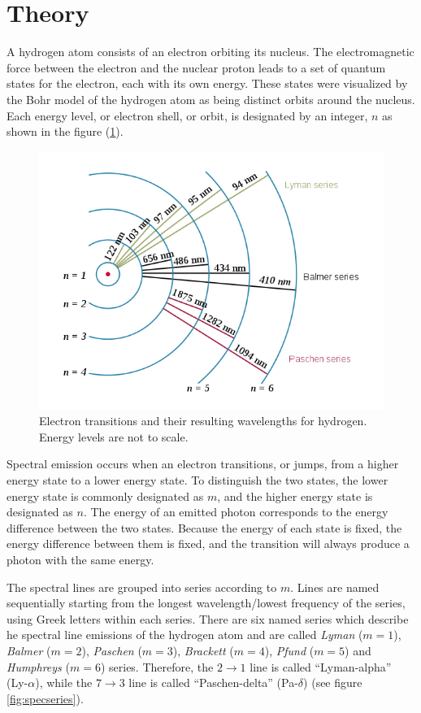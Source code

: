\documentclass[%
 reprint,
 amsmath,amssymb,
 aps,
]{revtex4-2}
\begin{document}
\section{Theory}
    A hydrogen atom consists of an electron orbiting its nucleus. The electromagnetic force between the electron and the nuclear proton leads to a set of quantum states for the electron, each with its own energy. These states were visualized by the Bohr model of the hydrogen atom as being distinct orbits around the nucleus. Each energy level, or electron shell, or orbit, is designated by an integer, $n$ as shown in the figure (\ref{fig:Hatom}).
    \begin{figure}
        \centering
        \includegraphics[scale = 0.4]{Figures/600px-Hydrogen_transitions.svg.png}
        \caption{Electron transitions and their resulting wavelengths for hydrogen. Energy levels are not to scale.}
        \label{fig:Hatom}
    \end{figure}
    \par
    Spectral emission occurs when an electron transitions, or jumps, from a higher energy state to a lower energy state. To distinguish the two states, the lower energy state is commonly designated as $m$, and the higher energy state is designated as $n$. The energy of an emitted photon corresponds to the energy difference between the two states. Because the energy of each state is fixed, the energy difference between them is fixed, and the transition will always produce a photon with the same energy.
    \par
    The spectral lines are grouped into series according to $m$. Lines are named sequentially starting from the longest wavelength/lowest frequency of the series, using Greek letters within each series. There are six named series which describe he spectral line emissions of the hydrogen atom and are called \textit{Lyman} ($m = 1$), \textit{Balmer} ($m = 2$), \textit{Paschen} ($m = 3$), \textit{Brackett} ($m = 4$), \textit{Pfund} ($m = 5$) and \textit{Humphreys} ($m = 6$) series. Therefore, the $2 \rightarrow 1$ line is called ``Lyman-alpha'' (Ly-$\alpha$), while the $7 \rightarrow 3$ line is called ``Paschen-delta'' (Pa-$\delta$) (see figure \ref{fig:specseries}).
\end{document}
